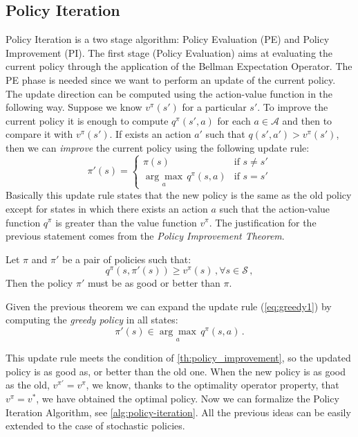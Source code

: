 \subsection{Policy Iteration} \label{sec:pi}
Policy Iteration \citep{howard:dp} is a two stage algorithm: Policy Evaluation (PE) and Policy Improvement (PI).
The first stage (Policy Evaluation) aims at evaluating the current policy through the application of the Bellman Expectation Operator. The PE phase is needed since we want to perform an update of the current policy. The update direction can be computed using the action-value function in the following way. Suppose we know $v^\pi(s')$ for a particular $s'$. To improve the current policy it is enough to compute $q^\pi(s',a)$ for each $a \in \mathcal{A}$ and then to compare it with $v^\pi(s')$. If exists an action $a'$ such that $q(s',a') > v^\pi(s')$, then we can \textit{improve} the current policy using the following update rule:
\begin{equation}
\pi'(s) =
	\left\{
	\begin{array}{ll}
		\pi(s)  & \mbox{if } s \neq s' \\
		\underset{a}{\arg \max} \, q^\pi(s,a) & \mbox{if } s = s'
	\end{array}
\right .
\label{eq:greedy1}
\end{equation}
Basically this update rule states that the new policy is the same as the old policy except for states in which there exists an action $a$ such that the action-value function $q^\pi$ is greater than the value function $v^\pi$. 
The justification for the previous statement comes from the \textit{Policy Improvement Theorem}.
\begin{theorem}
	Let $\pi$ and $\pi'$ be a pair of policies such that:
	\begin{equation}
		q^\pi(s, \pi'(s)) \geq v^\pi(s) \, , \forall s \in \mathcal{S} \, ,
	\end{equation}
	Then the policy $\pi'$ must be as good or better than $\pi$. 
	\label{th:policy_improvement}
\end{theorem}

Given the previous theorem we can expand the update rule (\ref{eq:greedy1}) by computing the \textit{greedy policy} in all states:
\begin{equation}
\pi'(s) \in \underset{a}{\arg \max} \, q^\pi(s,a) 	\, .
	\label{eq:greedy2}
\end{equation}

This update rule meets the condition of \cref{th:policy_improvement}, so the updated policy is as good as, or better than the old one. 
When the new policy is as good as the old, $v^{\pi'} = v^\pi$, we know, thanks to the optimality operator property, that $v^\pi = v^*$, we have obtained the optimal policy.
Now we can formalize the Policy Iteration Algorithm, see \cref{alg:policy-iteration}.
All the previous ideas can be easily extended to the case of stochastic policies.

